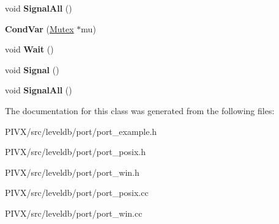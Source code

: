 \begin{DoxyCompactItemize}
void {\bfseries Signal\+All} ()
\item 
\mbox{\label{classleveldb_1_1port_1_1_cond_var_abb23c74c7b58298a20d4cfd6a0c5839a}} 
{\bfseries Cond\+Var} (\mbox{\hyperlink{classleveldb_1_1port_1_1_mutex}{Mutex}} $\ast$mu)
\item 
\mbox{\label{classleveldb_1_1port_1_1_cond_var_a9e9855595a3f3a3ccf47949696065597}} 
void {\bfseries Wait} ()
\item 
\mbox{\label{classleveldb_1_1port_1_1_cond_var_ac36a2038b058b24886741c99e4a7d7d4}} 
void {\bfseries Signal} ()
\item 
\mbox{\label{classleveldb_1_1port_1_1_cond_var_ad7725662f3c1bc542100c41081d1428a}} 
void {\bfseries Signal\+All} ()
\end{DoxyCompactItemize}


The documentation for this class was generated from the following files\+:\begin{DoxyCompactItemize}
\item 
P\+I\+V\+X/src/leveldb/port/port\+\_\+example.\+h\item 
P\+I\+V\+X/src/leveldb/port/port\+\_\+posix.\+h\item 
P\+I\+V\+X/src/leveldb/port/port\+\_\+win.\+h\item 
P\+I\+V\+X/src/leveldb/port/port\+\_\+posix.\+cc\item 
P\+I\+V\+X/src/leveldb/port/port\+\_\+win.\+cc\end{DoxyCompactItemize}
